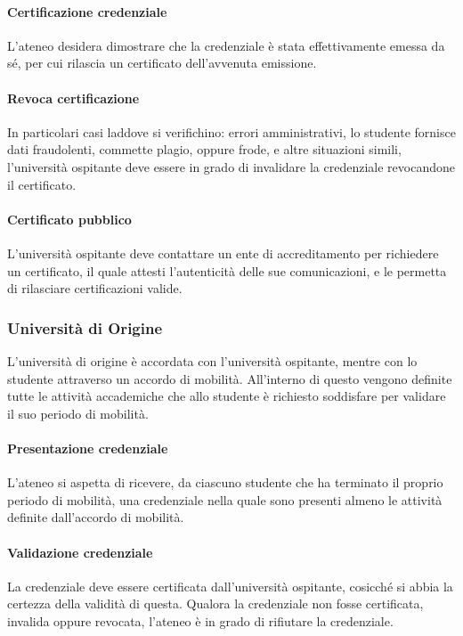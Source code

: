 \documentclass[a4paper,12pt]{article}
\begin{document}
\paragraph{Certificazione credenziale} L'ateneo desidera dimostrare che la credenziale è stata effettivamente emessa da sé, per cui rilascia un certificato dell'avvenuta emissione.
\paragraph{Revoca certificazione} In particolari casi laddove si verifichino: errori amministrativi, lo studente fornisce dati fraudolenti, commette plagio, oppure frode, e altre situazioni simili, l'università ospitante deve essere in grado di invalidare la credenziale revocandone il certificato.
\paragraph{Certificato pubblico} L'università ospitante deve contattare un ente di accreditamento per richiedere un certificato, il quale attesti l'autenticità delle sue comunicazioni, e le permetta di rilasciare certificazioni valide.

\subsubsection{Università di Origine}
L'università di origine è accordata con l'università ospitante, mentre con lo studente attraverso un accordo di mobilità. All'interno di questo vengono definite tutte le attività accademiche che allo studente è richiesto soddisfare per validare il suo periodo di mobilità.
\paragraph{Presentazione credenziale} L'ateneo si aspetta di ricevere, da ciascuno studente che ha terminato il proprio periodo di mobilità, una credenziale nella quale sono presenti almeno le attività definite dall'accordo di mobilità.
\paragraph{Validazione credenziale} La credenziale deve essere certificata dall'università ospitante, cosicché si abbia la certezza della validità di questa. Qualora la credenziale non fosse certificata, invalida oppure revocata, l'ateneo è in grado di rifiutare la credenziale.
\end{document}
